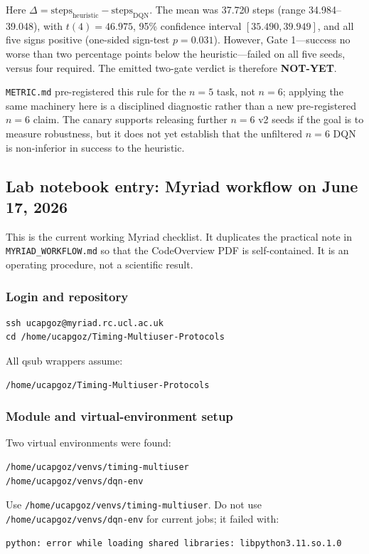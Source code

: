\documentclass[11pt]{article}
\newcommand{\file}[1]{\texttt{\small #1}}
\begin{document}
Here $\Delta=\text{steps}_{\mathrm{heuristic}}-\text{steps}_{\mathrm{DQN}}$.
The mean was 37.720 steps (range 34.984--39.048), with
$t(4)=46.975$, 95\% confidence interval $[35.490,39.949]$, and all five signs
positive (one-sided sign-test $p=0.031$). However, Gate 1---success no worse than
two percentage points below the heuristic---failed on all five seeds, versus
four required. The emitted two-gate verdict is therefore \textbf{NOT-YET}.

\file{METRIC.md} pre-registered this rule for the $n=5$ task, not $n=6$;
applying the same machinery here is a disciplined diagnostic rather than a new
pre-registered $n=6$ claim. The canary supports releasing further $n=6$ v2 seeds
if the goal is to measure robustness, but it does not yet establish that the
unfiltered $n=6$ DQN is non-inferior in success to the heuristic.

\subsection{Lab notebook entry: Myriad workflow on June 17, 2026}
\label{sec:lablog-myriad-procedure-2026-06-17}

This is the current working Myriad checklist. It duplicates the practical note
in \file{MYRIAD\_WORKFLOW.md} so that the CodeOverview PDF is self-contained.
It is an operating procedure, not a scientific result.

\subsubsection*{Login and repository}
\begin{verbatim}
ssh ucapgoz@myriad.rc.ucl.ac.uk
cd /home/ucapgoz/Timing-Multiuser-Protocols
\end{verbatim}

All qsub wrappers assume:
\begin{verbatim}
/home/ucapgoz/Timing-Multiuser-Protocols
\end{verbatim}

\subsubsection*{Module and virtual-environment setup}
Two virtual environments were found:
\begin{verbatim}
/home/ucapgoz/venvs/timing-multiuser
/home/ucapgoz/venvs/dqn-env
\end{verbatim}

Use \file{/home/ucapgoz/venvs/timing-multiuser}. Do not use
\file{/home/ucapgoz/venvs/dqn-env} for current jobs; it failed with:
\begin{verbatim}
python: error while loading shared libraries: libpython3.11.so.1.0
\end{verbatim}
\end{document}
